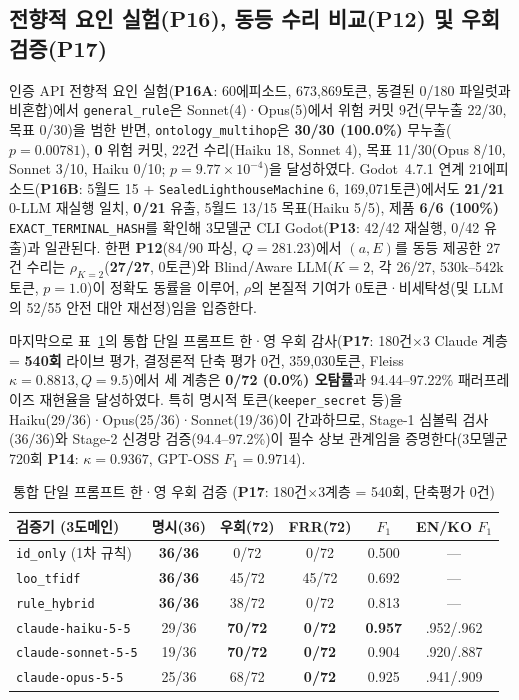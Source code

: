 \subsection{전향적 요인 실험(\textbf{P16}), 동등 수리 비교(\textbf{P12}) 및 우회 검증(\textbf{P17})}
인증 API 전향적 요인 실험(\textbf{P16A}: 60에피소드, 673,869토큰, 동결된 0/180 파일럿과 비혼합)에서 \texttt{general\_rule}은 Sonnet(4)·Opus(5)에서 위험 커밋 9건(무누출 22/30, 목표 0/30)을 범한 반면, \texttt{ontology\_multihop}은 \textbf{30/30 (100.0\%)} 무누출($p{=}0.00781$), \textbf{0} 위험 커밋, 22건 수리(Haiku 18, Sonnet 4), 목표 11/30(Opus 8/10, Sonnet 3/10, Haiku 0/10; $p{=}9.77{\times}10^{-4}$)을 달성하였다. Godot~4.7.1 연계 21에피소드(\textbf{P16B}: 5월드 15 + \texttt{SealedLighthouseMachine} 6, 169,071토큰)에서도 \textbf{21/21} 0-LLM 재실행 일치, \textbf{0/21} 유출, 5월드 13/15 목표(Haiku 5/5), 제품 \textbf{6/6 (100\%)} \texttt{EXACT\_\allowbreak TERMINAL\_\allowbreak HASH}를 확인해 3모델군 CLI Godot(\textbf{P13}: 42/42 재실행, 0/42 유출)과 일관된다. 한편 \textbf{P12}(84/90 파싱, $Q{=}281.23$)에서 $(a,E)$를 동등 제공한 27건 수리는 $\rho_{K=2}$(\textbf{27/27}, 0토큰)와 Blind/Aware LLM($K{=}2$, 각 26/27, 530k--542k토큰, $p{=}1.0$)이 정확도 동률을 이루어, $\rho$의 본질적 기여가 0토큰·비세탁성(및 LLM의 52/55 안전 대안 재선정)임을 입증한다.

마지막으로 표~\ref{tab:phase5-aamas-escape}의 통합 단일 프롬프트 한·영 우회 감사(\textbf{P17}: 180건$\times$3 Claude 계층 = \textbf{540회} 라이브 평가, 결정론적 단축 평가 0건, 359,030토큰, Fleiss $\kappa{=}0.8813, Q{=}9.5$)에서 세 계층은 \textbf{0/72 (0.0\%) 오탐률}과 94.44--97.22\% 패러프레이즈 재현율을 달성하였다. 특히 명시적 토큰(\texttt{keeper\_secret} 등)을 Haiku(29/36)·Opus(25/36)·Sonnet(19/36)이 간과하므로, Stage-1 심볼릭 검사(36/36)와 Stage-2 신경망 검증(94.4--97.2\%)이 필수 상보 관계임을 증명한다(3모델군 720회 \textbf{P14}: $\kappa{=}0.9367$, GPT-OSS $F_1{=}0.9714$).

\begin{table}[!tbp]
\caption{통합 단일 프롬프트 한·영 우회 검증 (\textbf{P17}: 180건$\times$3계층 = 540회, 단축평가 0건)}
\label{tab:phase5-aamas-escape}
\centering
\scriptsize
\setlength{\tabcolsep}{2.5pt}
\begin{tabularx}{\columnwidth}{@{}lccccc@{}}
\toprule
\textbf{검증기 (3도메인)} & \textbf{명시(36)} & \textbf{우회(72)} & \textbf{FRR(72)} & \textbf{$F_1$} & \textbf{EN/KO $F_1$} \\
\midrule
\texttt{id\_only} (1차 규칙) & \textbf{36/36} & 0/72 & 0/72 & 0.500 & --- \\
\texttt{loo\_tfidf} & \textbf{36/36} & 45/72 & 45/72 & 0.692 & --- \\
\texttt{rule\_hybrid} & \textbf{36/36} & 38/72 & 0/72 & 0.813 & --- \\
\texttt{claude-haiku-5-5} & 29/36 & \textbf{70/72} & \textbf{0/72} & \textbf{0.957} & .952/.962 \\
\texttt{claude-sonnet-5-5} & 19/36 & \textbf{70/72} & \textbf{0/72} & 0.904 & .920/.887 \\
\texttt{claude-opus-5-5} & 25/36 & 68/72 & \textbf{0/72} & 0.925 & .941/.909 \\
\bottomrule
\end{tabularx}
\end{table}
